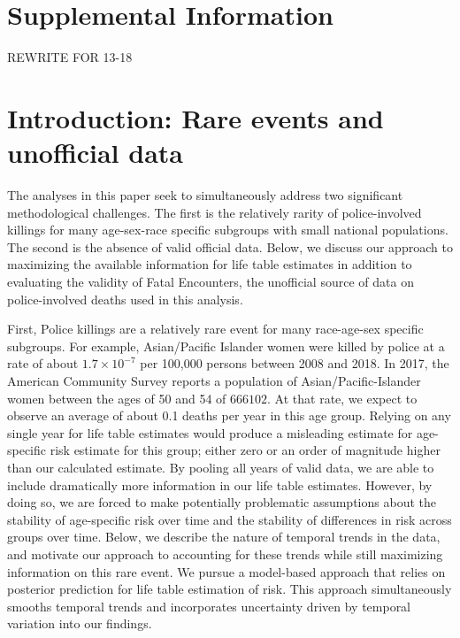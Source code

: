 \documentclass{article}
\begin{document}
\section*{Supplemental Information}
REWRITE FOR 13-18
\section{Introduction: Rare events and unofficial data}

The analyses in this paper seek to simultaneously address two significant methodological challenges. The first is the relatively rarity of police-involved killings for many age-sex-race specific subgroups with small national populations. The second is the absence of valid official data. Below, we discuss our approach to maximizing the available information for life table estimates in addition to evaluating the validity of Fatal Encounters, the unofficial source of data on police-involved deaths used in this analysis. 

First, Police killings are a relatively rare event for many race-age-sex specific subgroups. For example, Asian/Pacific Islander women were killed by police at a rate of about $1.7 \times 10^{-7}$ per 100,000 persons between 2008 and 2018. In 2017, the American Community Survey reports a population of Asian/Pacific-Islander women between the ages of 50 and 54 of $666102$. At that rate, we expect to observe an average of about 0.1 deaths per year in this age group. Relying on any single year for life table estimates would produce a misleading estimate for age-specific risk estimate for this group; either zero or an order of magnitude higher than our calculated estimate. By pooling all years of valid data, we are able to include dramatically more information in our life table estimates. However, by doing so, we are forced to make potentially problematic assumptions about the stability of age-specific risk over time and the stability of differences in risk across groups over time. Below, we describe the nature of temporal trends in the data, and motivate our approach to accounting for these trends while still maximizing information on this rare event. We pursue a model-based approach that relies on posterior prediction for life table estimation of risk. This approach simultaneously smooths temporal trends and incorporates uncertainty driven by temporal variation into our findings. 
\end{document}
